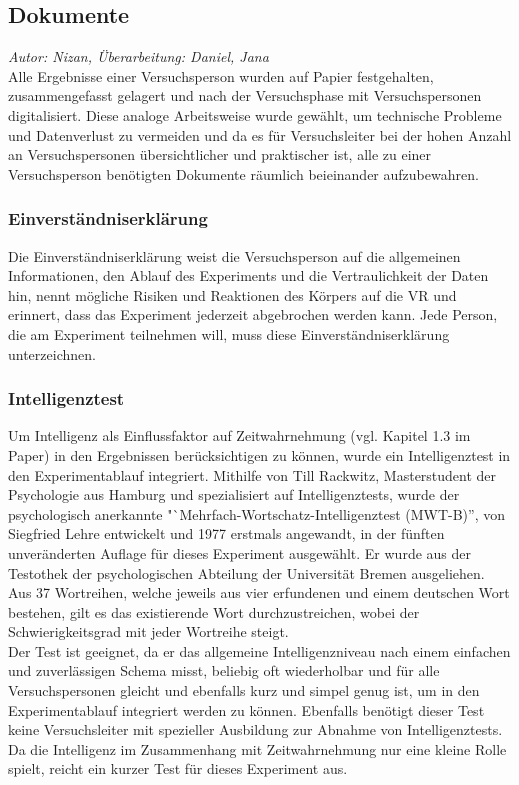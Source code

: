 \documentclass{Bericht}
\begin{document}
\label{subsec:dokumente}
\subsection{Dokumente}
\textit{Autor: Nizan, Überarbeitung: Daniel, Jana}\\
Alle Ergebnisse einer Versuchsperson wurden auf Papier festgehalten, zusammengefasst gelagert und nach der Versuchsphase mit Versuchspersonen digitalisiert. Diese analoge Arbeitsweise wurde gewählt, um technische Probleme und Datenverlust zu vermeiden und da es für Versuchsleiter bei der hohen Anzahl an Versuchspersonen übersichtlicher und praktischer ist, alle zu einer Versuchsperson benötigten Dokumente räumlich beieinander aufzubewahren.

\subsubsection{Einverständniserklärung}
Die Einverständniserklärung weist die Versuchsperson auf die allgemeinen Informationen, den Ablauf des Experiments und die Vertraulichkeit der Daten hin, nennt mögliche Risiken und Reaktionen des Körpers auf die VR und erinnert, dass das Experiment jederzeit abgebrochen werden kann. Jede Person, die am Experiment teilnehmen will, muss diese Einverständniserklärung unterzeichnen.

\subsubsection{Intelligenztest}
Um Intelligenz als Einflussfaktor auf Zeitwahrnehmung (vgl. Kapitel 1.3 im Paper) in den Ergebnissen berücksichtigen zu können, wurde ein Intelligenztest in den Experimentablauf integriert.
Mithilfe von Till Rackwitz, Masterstudent der Psychologie aus Hamburg und spezialisiert auf Intelligenztests, wurde der psychologisch anerkannte "`Mehrfach-Wortschatz-Intelligenztest (MWT-B)'', von Siegfried Lehre entwickelt und 1977 erstmals angewandt, in der fünften unveränderten Auflage für dieses Experiment ausgewählt. Er wurde aus der Testothek der psychologischen Abteilung der Universität Bremen ausgeliehen.\\
Aus 37 Wortreihen, welche jeweils aus vier erfundenen und einem deutschen Wort bestehen, gilt es das existierende Wort durchzustreichen, wobei der Schwierigkeitsgrad mit jeder Wortreihe steigt.\\
Der Test ist geeignet, da er das allgemeine Intelligenzniveau nach einem einfachen und zuverlässigen Schema misst, beliebig oft wiederholbar und für alle Versuchspersonen gleicht und ebenfalls kurz und simpel genug ist, um in den Experimentablauf integriert werden zu können. Ebenfalls benötigt dieser Test keine Versuchsleiter mit spezieller Ausbildung zur Abnahme von Intelligenztests. 
Da die Intelligenz im Zusammenhang mit Zeitwahrnehmung nur eine kleine Rolle spielt, reicht ein kurzer Test für dieses Experiment aus. 
\end{document}
